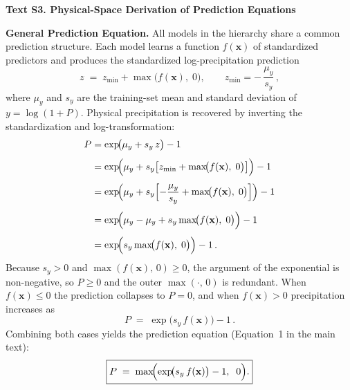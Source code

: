 
\textbf{Text S3.  Physical-Space Derivation of Prediction Equations}

\vspace{0.5em}
\textbf{General Prediction Equation.}
All models in the hierarchy share a common prediction structure.  Each model
learns a function $f(\mathbf{x})$ of standardized predictors and produces the
standardized log-precipitation prediction
%
\begin{equation}
  z \;=\; z_{\min} + \max\!\bigl(f(\mathbf{x}),\;0\bigr),
  \qquad
  z_{\min} = -\,\frac{\mu_y}{s_y}\,,
  \label{eq:s-zfloor}
\end{equation}
%
where $\mu_y$ and $s_y$ are the training-set mean and standard deviation of
$y = \log(1 + P)$.  Physical precipitation is recovered by inverting the
standardization and log-transformation:
%
\begin{align}
  P &= \exp\!\bigl(\mu_y + s_y\,z\bigr) - 1 \notag\\[4pt]
    &= \exp\!\Bigl(\mu_y + s_y\bigl[z_{\min}
       + \max\!\bigl(f(\mathbf{x}),\;0\bigr)\bigr]\Bigr) - 1 \notag\\[4pt]
    &= \exp\!\Bigl(\mu_y + s_y\Bigl[-\frac{\mu_y}{s_y}
       + \max\!\bigl(f(\mathbf{x}),\;0\bigr)\Bigr]\Bigr) - 1 \notag\\[4pt]
    &= \exp\!\Bigl(\mu_y - \mu_y
       + s_y\max\!\bigl(f(\mathbf{x}),\;0\bigr)\Bigr) - 1 \notag\\[4pt]
    &= \exp\!\Bigl(s_y\max\!\bigl(f(\mathbf{x}),\;0\bigr)\Bigr) - 1\,.
  \label{eq:s-cancel}
\end{align}
%
Because $s_y > 0$ and $\max(f(\mathbf{x}),\,0) \geq 0$, the argument of the
exponential is non-negative, so $P \geq 0$ and the outer $\max(\cdot,\,0)$ is
redundant.  When $f(\mathbf{x}) \leq 0$ the prediction collapses to $P = 0$,
and when $f(\mathbf{x}) > 0$ precipitation increases as
%
\begin{equation}
  P \;=\; \exp\!\bigl(s_y\,f(\mathbf{x})\bigr) - 1\,.
  \label{eq:s-pred-positive}
\end{equation}
%
Combining both cases yields the prediction equation (Equation~1 in the main
text):
%
\begin{equation}
  \boxed{P \;=\; \max\!\Bigl(\exp\!\bigl(s_y\,f(\mathbf{x})\bigr)
         - 1,\;\;0\Bigr).}
  \label{eq:s-pred}
\end{equation}


